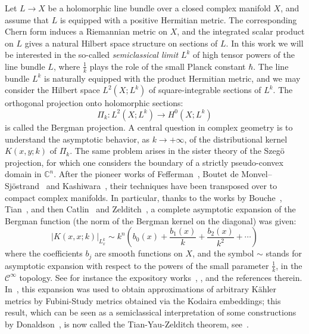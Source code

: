 \documentclass{article}
\newcommand{\abs}[1]{\left|#1\right|}
\newcommand{\Cinf}{\mathscr{C}^\infty}
\newcommand{\CM}{\mathbb{C}}
\newcommand{\h}{\hbar}
\begin{document}
Let $L\to X$ be a holomorphic line bundle over a closed complex
manifold $X$, and assume that $L$ is equipped with a positive
Hermitian metric.  The corresponding Chern form induces a Riemannian
metric on $X$, and the integrated scalar product on $L$ gives a
natural Hilbert space structure on sections of $L$. In this work we
will be interested in the so-called \emph{semiclassical limit} $L^k$
of high tensor powers of the line bundle $L$, where $\frac{1}{k}$
plays the role of the small Planck constant $\h$. The line bundle
$L^k$ is naturally equipped with the product Hermitian metric, and we
may consider the Hilbert space $L^2(X;L^k)$ of square-integrable
sections of $L^k$.  The orthogonal projection onto holomorphic
sections:
\[
\Pi_k : L^2(X;L^k) \to H^0(X; L^k)
\]
is called the Bergman projection. A central question in complex
geometry is to understand the asymptotic behavior, as $k\to+\infty$,
of the distributional kernel $K(x,y;k)$ of $\Pi_k$. The same problem
arises in the sister theory of the Szegö projection, for which one
considers the boundary of a strictly pseudo-convex domain in $\CM^n$.
After the pioneer works of Fefferman~\cite{fefferman74}, Boutet de
Monvel--Sjöstrand~\cite{boutet-sjostrand76} and
Kashiwara~\cite{kashiwara77}, their techniques have been transposed
over to compact complex manifolds.  In particular, thanks to the works
by Bouche~\cite{bouche90}, Tian~\cite{tian90}, and then
Catlin~\cite{catlin99} and Zelditch~\cite{zelditch98}, a complete
asymptotic expansion of the Bergman function (the norm of the Bergman
kernel on the diagonal) was given:
\[
\abs{K(x,x;k)}_{L^k_x} \sim {k^n}\left(b_0(x) + \frac{b_1(x)}{k} +
  \frac{b_2(x)}{k^2} + \cdots\right)
\]
where the coefficients $b_j$ are smooth functions on $X$, and the
symbol $\sim$ stands for asymptotic expansion with respect to the
powers of the small parameter $\frac{1}{k}$, in the $\Cinf$
topology. See for instance the expository works~\cite{berndtsson03},
\cite{ma-marinescu}, and the references therein.
In~\cite{zelditch98}, this expansion was used to obtain approximations
of arbitrary Kähler metrics by Fubini-Study metrics obtained via the
Kodaira embeddings; this result, which can be seen as a semiclassical
interpretation of some constructions by Donaldson~\cite{Donaldson96},
is now called the Tian-Yau-Zelditch theorem, see~\cite{Phong-Sturm07}.
\end{document}
